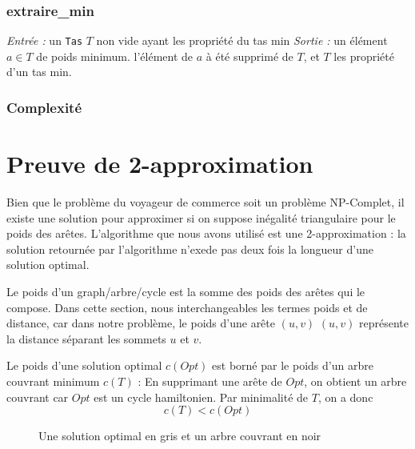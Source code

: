 \documentclass[a4paper,11pt]{article}
\begin{document}
\subsubsection*{extraire_min}
\textit{Entrée :} un \texttt{Tas} $T$ non vide ayant les propriété du tas min
\textit{Sortie :} un élément $a \in T$ de poids minimum. l'élément de $a$ à été supprimé de $T$, et $T$  les propriété d'un tas min.
\subsubsection*{Complexité}


\section{Preuve de 2-approximation} %
Bien que le problème du voyageur de commerce soit un problème NP-Complet, il existe une solution pour approximer si on suppose inégalité triangulaire pour le poids des arêtes. L'algorithme que nous avons utilisé est une 2-approximation : la solution retournée par l'algorithme n'exede pas deux fois la longueur d'une solution optimal.

Le poids d'un graph/arbre/cycle est la somme des poids des arêtes qui le compose.
Dans cette section, nous interchangeables les termes poids et de distance, car dans notre problème, le poids d'une arête $(u,v)$ $(u,v)$ représente la distance séparant les sommets $u$ et $v$.

Le poids d'une solution optimal $c(Opt)$ est borné par le poids d'un arbre couvrant minimum $c(T)$ :
En supprimant une arête de $Opt$, on obtient un arbre couvrant car $Opt$ est un cycle hamiltonien. Par minimalité de $T$, on a donc \begin{equation}
c(T) < c(Opt)
\label{eq1}
\end{equation}

\begin{figure}[!h]
\centering
{}
\caption{Une solution optimal en gris et un arbre couvrant en noir}
\end{figure}
\end{document}
